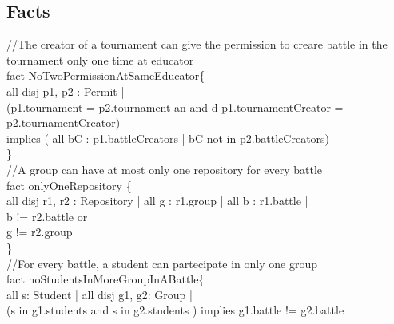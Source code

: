 \documentclass{article}
\begin{document}
{\subsection{Facts}
\color{gray}
//The creator of a tournament can give the permission to creare battle in the tournament only one time at educator\\
\color{black}
\color{blue} fact \color{black} NoTwoPermissionAtSameEducator\{\\
\-\hspace{1cm} \color{blue} all disj \color{black} p1, p2 : Permit | \\
\-\hspace{1cm} (p1.tournament \color{blue} = \color{black} p2.tournament an\color{blue} and \color{black}d p1.tournamentCreator \color{blue} = \color{black} p2.tournamentCreator) \\
\-\hspace{1cm} implies (\color{blue} all \color{black} bC : p1.battleCreators | bC \color{blue} not in \color{black} p2.battleCreators)\\
\}
\\
\color{gray}
//A group can have at most only one repository for every battle\\
\color{blue} fact \color{black} onlyOneRepository \{\\
\-\hspace{1cm} \color{blue} all disj \color{black} r1, r2 : Repository | \color{blue} all \color{black} g : r1.group | \color{blue} all \color{black} b : r1.battle | \\
\-\hspace{1cm}b \color{blue} != \color{black} r2.battle or \\
\-\hspace{1cm}g \color{blue} != \color{black} r2.group \\
\}
\\
\color{gray}
//For every battle, a student can partecipate in only one group\\
\color{black}
\color{blue} fact \color{black} noStudentsInMoreGroupInABattle\{\\
\-\hspace{1cm} \color{blue} all \color{black} s: Student | \color{blue} all disj \color{black} g1, g2: Group | \\
\-\hspace{1cm}(s \color{blue} in \color{black} g1.students \color{blue} and \color{black} s \color{blue} in \color{black} g2.students ) \color{blue} implies \color{black} g1.battle != g2.battle \\
}
\end{document}

